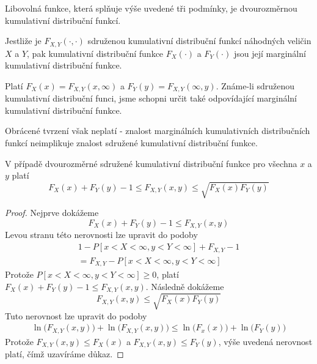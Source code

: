 \begin{definition}
Libovolná funkce, která splňuje výše uvedené tři podmínky, je dvourozměrnou kumulativní distribuční funkcí.
\end{definition}

\begin{definition}
Jestliže je $F_{X,Y}(\cdot, \cdot)$ sdruženou kumulativní distribuční funkcí náhodných veličin $X$ a $Y$, pak kumulativní distribuční funkce $F_X(\cdot)$ a $F_Y(\cdot)$ jsou její marginální kumulativní distribuční funkce.
\end{definition}

\begin{corollary}
Platí $F_X(x) = F_{X,Y}(x, \infty)$ a $F_Y(y) = F_{X,Y}(\infty, y)$. Známe-li sdruženou kumulativní distribuční funci, jsme schopni určit také odpovídající marginální kumulativní distribuční funkce. 
\end{corollary}

Obrácené tvrzení však neplatí - znalost marginálních kumulativních distribučních funkcí neimplikuje znalost sdružené kumulativní distribuční funkce.

\begin{theorem}
V případě dvourozměrné sdružené kumulativní distribuční funkce pro všechna $x$ a $y$ platí
\begin{equation*}
F_X(x) + F_Y(y) - 1 \le F_{X,Y}(x,y) \le \sqrt{F_X(x)F_Y(y)}
\end{equation*}
\end{theorem}

\begin{proof}
Nejprve dokážeme
\begin{equation*}
F_X(x) + F_Y(y) - 1 \le F_{X,Y}(x,y)
\end{equation*}
Levou stranu této nerovnosti lze upravit do podoby
\begin{gather*}
1 - P[x < X < \infty, y < Y < \infty] + F_{X,Y} - 1\\
= F_{X,Y} - P[x < X < \infty, y < Y < \infty]
\end{gather*}
Protože $P[x < X < \infty, y < Y < \infty] \ge 0$, platí $F_X(x) + F_Y(y) - 1 \le F_{X,Y}(x,y)$. Následně dokážeme
\begin{equation*}
F_{X,Y}(x,y) \le \sqrt{F_X(x)F_Y(y)}
\end{equation*}
Tuto nerovnost lze upravit do podoby
\begin{gather*}
\ln \big(F_{X,Y}(x,y) \big) + \ln \big( F_{X,Y}(x,y) \big) \le \ln \big(F_x(x) \big) + \ln \big( F_Y(y) \big)
\end{gather*}
Protože $F_{X,Y}(x,y) \le F_X(x)$ a $F_{X,Y}(x,y) \le F_Y(y)$, výše uvedená nerovnost platí, čímž uzavíráme důkaz.
\end{proof}

